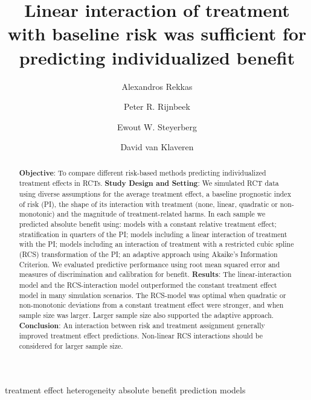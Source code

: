 \documentclass[]{elsarticle} %
\date{}
\begin{document}
\begin{frontmatter}

  \title{Linear interaction of treatment with baseline risk was
sufficient for predicting individualized benefit}
    \author[1]{Alexandros Rekkas}
  
    \author[1]{Peter R. Rijnbeek}
  
    \author[2]{Ewout W. Steyerberg}
  
    \author[3]{David van Klaveren}
  
      \address[1]{Department of Medical Informatics, Erasmus Medical
Center, Rotterdam, The Netherlands}
    \address[2]{Department of Biomedical Data Sciences, Leiden
University Medical Center, Leiden, The Netherlands}
    \address[3]{Department of Public Health, Erasmus Medical Center,
Rotterdam, The Netherlands}
    
  \begin{abstract}
  \textbf{Objective}: To compare different risk-based methods predicting
  individualized treatment effects in RCTs. \textbf{Study Design and
  Setting}: We simulated RCT data using diverse assumptions for the
  average treatment effect, a baseline prognostic index of risk (PI),
  the shape of its interaction with treatment (none, linear, quadratic
  or non-monotonic) and the magnitude of treatment-related harms. In
  each sample we predicted absolute benefit using: models with a
  constant relative treatment effect; stratification in quarters of the
  PI; models including a linear interaction of treatment with the PI;
  models including an interaction of treatment with a restricted cubic
  spline (RCS) transformation of the PI; an adaptive approach using
  Akaike's Information Criterion. We evaluated predictive performance
  using root mean squared error and measures of discrimination and
  calibration for benefit. \textbf{Results}: The linear-interaction
  model and the RCS-interaction model outperformed the constant
  treatment effect model in many simulation scenarios. The RCS-model was
  optimal when quadratic or non-monotonic deviations from a constant
  treatment effect were stronger, and when sample size was larger.
  Larger sample size also supported the adaptive approach.
  \textbf{Conclusion}: An interaction between risk and treatment
  assignment generally improved treatment effect predictions. Non-linear
  RCS interactions should be considered for larger sample size.
  \end{abstract}
   \begin{keyword} treatment effect heterogeneity absolute
benefit prediction models\end{keyword}
 \end{frontmatter}
\end{document}
